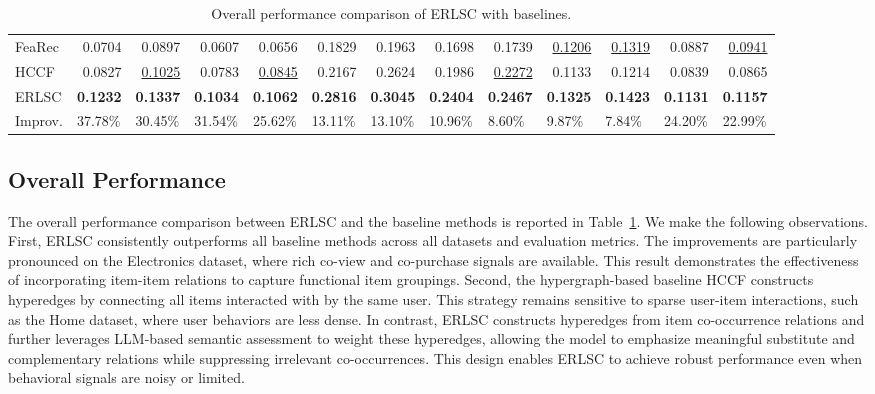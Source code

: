 \begin{table}[]
{\begin{tabular}{l|rrrr|rrrr|rrrr}
FeaRec  & 0.0704                      & 0.0897                      & 0.0607                      & 0.0656                 & 0.1829                & 0.1963                      & 0.1698                & 0.1739                 
&\uline{0.1206}                     &\uline{0.1319}               & 0.0887                 & \uline{0.0941}                 \\
HCCF & 0.0827                &\uline{0.1025}                      & 0.0783                     & \uline{0.0845}                       & 0.2167                      & 0.2624                      & 0.1986                      & \uline{0.2272}                      & 0.1133                      & 0.1214                      & 0.0839                       & 0.0865                       \\ \hline
ERLSC      & \textbf{0.1232}             & \textbf{0.1337}             & \textbf{0.1034}             & \textbf{0.1062}              & \textbf{0.2816}             & \textbf{0.3045}             & \textbf{0.2404}             & \textbf{0.2467}              & \textbf{0.1325}             & \textbf{0.1423}             & \textbf{0.1131}              & \textbf{0.1157}              \\ \hline
Improv.    & \multicolumn{1}{l}{37.78\%} & \multicolumn{1}{l}{30.45\%} & \multicolumn{1}{l}{31.54\%} & \multicolumn{1}{l|}{25.62\%} & \multicolumn{1}{l}{13.11\%} & \multicolumn{1}{l}{13.10\%} & \multicolumn{1}{l}{10.96\%} & \multicolumn{1}{l|}{8.60\%} & \multicolumn{1}{l}{9.87\%} & \multicolumn{1}{l}{7.84\%} & \multicolumn{1}{l}{24.20\%} & \multicolumn{1}{l}{22.99\%} \\ \hline
\end{tabular}
}\caption{Overall performance comparison of ERLSC with baselines.}\label{tab_erlsc:overall}
\end{table}

\subsection{Overall Performance}
The overall performance comparison between ERLSC and the baseline methods is reported in Table~\ref{tab_erlsc:overall}. We make the following observations.
First, ERLSC consistently outperforms all baseline methods across all datasets and evaluation metrics. The improvements are particularly pronounced on the Electronics dataset, where rich co-view and co-purchase signals are available. This result demonstrates the effectiveness of incorporating item-item relations to capture functional item groupings.
Second, the hypergraph-based baseline HCCF constructs hyperedges by connecting all items interacted with by the same user. This strategy remains sensitive to sparse user-item interactions, such as the Home dataset, where user behaviors are less dense. In contrast, ERLSC constructs hyperedges from item co-occurrence relations and further leverages LLM-based semantic assessment to weight these hyperedges, allowing the model to emphasize meaningful substitute and complementary relations while suppressing irrelevant co-occurrences. This design enables ERLSC to achieve robust performance even when behavioral signals are noisy or limited.



